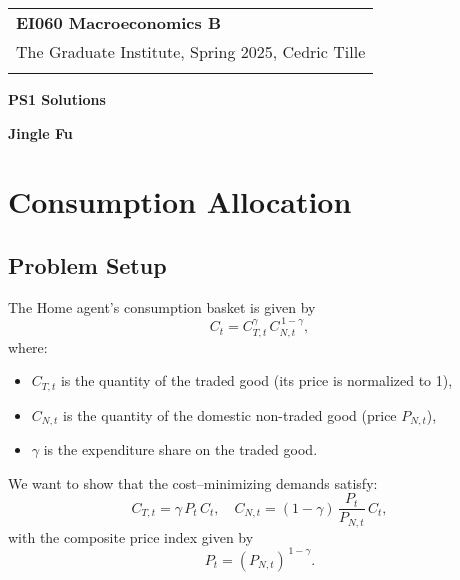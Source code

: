 \documentclass[a4paper,12pt]{article} %
\theoremstyle{nonitalic}
\begin{document}
\thispagestyle{empty} %

\begin{tabular}{p{15.5cm}} %
{\large \bf EI060 Macroeconomics B} \\
The Graduate Institute, Spring 2025, Cedric Tille\\
\hline %
\\
\end{tabular} %

\vspace*{0.3cm} %

\begin{center} %
	{\Large \bf PS1 Solutions} %
	\vspace{2mm}
	
	{\bf Jingle Fu} %
		
\end{center}  

\vspace{0.4cm}

\section{Consumption Allocation}

\subsection*{Problem Setup}
The Home agent's consumption basket is given by
\[
C_t = C_{T,t}^{\gamma}\,C_{N,t}^{\,1-\gamma},
\]
where:
\begin{itemize}
    \item $C_{T,t}$ is the quantity of the traded good (its price is normalized to 1),
    \item $C_{N,t}$ is the quantity of the domestic non-traded good (price $P_{N,t}$),
    \item $\gamma$ is the expenditure share on the traded good.
\end{itemize}
We want to show that the cost--minimizing demands satisfy:
\[
C_{T,t} = \gamma\,P_t\,C_t, \quad
C_{N,t} = (1-\gamma)\,\frac{P_t}{P_{N,t}}\,C_t,
\]
with the composite price index given by
\[
P_t = (P_{N,t})^{\,1-\gamma}.
\]
\end{document}
